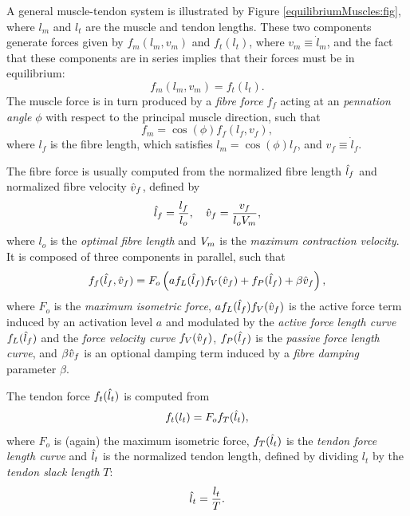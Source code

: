 A general muscle-tendon system is illustrated by Figure
\ref{equilibriumMuscles:fig}, where $l_m$ and $l_t$ are the muscle and
tendon lengths.  These two components generate forces given by
$f_m(l_m, v_m)$ and $f_t(l_t)$, where $v_m \equiv \dot l_m$, and the
fact that these components are in series implies that their forces
must be in equilibrium:
%
\begin{equation}
f_m(l_m, v_m) = f_t(l_t).
\label{equilibrium:eqn}
\end{equation}
%
The muscle force is in turn produced by a {\it fibre force} $f_f$
acting at an {\it pennation angle} $\phi$ with respect to the
principal muscle direction, such that
%
 \begin{equation*}
f_m = \cos(\phi) f_f (l_f, v_f),
\end{equation*}
%
where $l_f$ is the fibre length, which satisfies
$l_m = \cos(\phi) l_f$, and $v_f \equiv \dot l_f$.

The fibre force is usually computed from the normalized fibre length
$\hat{l}_f$ and normalized fibre velocity $\hat{v}_f$, defined by
%
\begin{equation}
\hat{l}_f = \frac{l_f}{l_o}, \quad \hat{v}_f = \frac{v_f}{l_o V_{m}},
\label{lfn:eqn}
\end{equation}
%
where $l_o$ is the {\it optimal fibre length} and $V_{m}$ is the {\it maximum
contraction velocity}. It is composed of three components in parallel,
such that
%
\begin{equation}
f_f (\hat{l}_f, \hat{v}_f) = F_o \left( a f_L(\hat{l}_f) f_V(\hat{v}_f) + f_P(\hat{l}_f) +
\beta \hat{v}_f \right),
\label{ff:eqn}
\end{equation}
%
where $F_o$ is the {\it maximum isometric force},
$a f_L(\hat{l}_f) f_V(\hat{v}_f)$ is the active force term induced by an
activation level $a$ and modulated by the {\it active force length
curve} $f_L(\hat{l}_f)$ and the {\it force velocity curve} $f_V(\hat{v}_f)$,
$f_P(\hat{l}_f)$ is the {\it passive force length curve}, and $\beta \hat{v}_f$
is an optional damping term induced by a {\it fibre damping} parameter
$\beta$.

The tendon force $f_t(\hat{l}_t)$ is computed from 
%
\begin{equation*}
f_t(l_t) = F_o f_T (\hat{l}_t),
\end{equation*}
%
where $F_o$ is (again) the maximum isometric force, $f_T(\hat{l}_t)$ is the
{\it tendon force length curve} and $\hat{l}_t$ is the normalized tendon
length, defined by dividing $l_t$ by the {\it tendon slack length}
$T$:
%
\begin{equation*}
\hat{l}_t = \frac{l_t}{T}.
\end{equation*}
%

